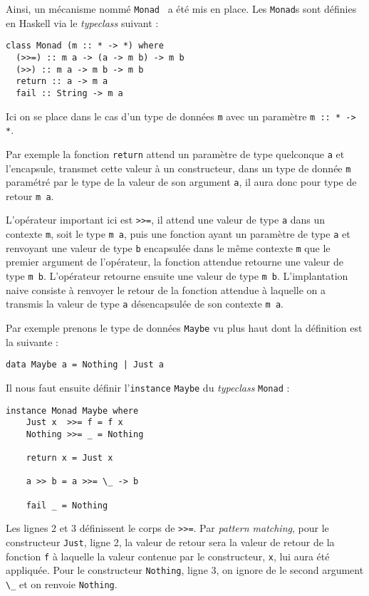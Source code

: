 \documentclass{llncs}
\begin{document}
Ainsi, un mécanisme nommé \lstinline{Monad}~\cite{Wadler90} a été mis en place.
Les \lstinline{Monad}s sont définies en Haskell via le \emph{typeclass} suivant :
\begin{lstlisting}
class Monad (m :: * -> *) where
  (>>=) :: m a -> (a -> m b) -> m b
  (>>) :: m a -> m b -> m b
  return :: a -> m a
  fail :: String -> m a
\end{lstlisting}

Ici on se place dans le cas d'un type de données \lstinline{m} avec un paramètre
\lstinline{m :: * -> *}.

Par exemple la fonction \lstinline{return} attend un paramètre de type quelconque
\lstinline{a} et l'encapsule, transmet cette valeur à un constructeur, dans
un type de donnée \lstinline{m} paramétré par le type de la valeur de son argument
\lstinline{a}, il aura donc pour type de retour \lstinline{m a}.

L'opérateur important ici est \lstinline{>>=}, il attend une valeur de type
\lstinline{a} dans un contexte \lstinline{m}, soit
le type \lstinline{m a}, puis une fonction ayant un paramètre de type \lstinline{a}
et renvoyant une valeur de type \lstinline{b} encapsulée dans le même contexte \lstinline{m}
que le premier argument de l'opérateur, la fonction attendue retourne
une valeur de type \lstinline{m b}. L'opérateur retourne ensuite une valeur de
type \lstinline{m b}.
L'implantation naive consiste à renvoyer le retour de la fonction attendue à
laquelle on a transmis la valeur de type \lstinline{a} désencapsulée de son contexte
\lstinline{m a}.

Par exemple prenons le type de données \lstinline{Maybe} vu plus haut dont la définition
est la suivante :
\begin{lstlisting}
data Maybe a = Nothing | Just a
\end{lstlisting}

Il nous faut ensuite définir l'\lstinline{instance} \lstinline{Maybe} du \emph{typeclass}
\lstinline{Monad} :
\begin{lstlisting}
instance Monad Maybe where
    Just x  >>= f = f x
    Nothing >>= _ = Nothing

    return x = Just x

    a >> b = a >>= \_ -> b

    fail _ = Nothing
\end{lstlisting}

Les lignes 2 et 3 définissent le corps de \lstinline{>>=}.
Par \emph{pattern matching}, pour le constructeur \lstinline{Just}, ligne 2,
la valeur de retour sera la valeur de retour de la fonction \lstinline{f} à
laquelle la valeur contenue par le constructeur, \lstinline{x}, lui aura été appliquée.
Pour le constructeur \lstinline{Nothing}, ligne 3, on ignore de le second argument
\lstinline{\_} et on renvoie \lstinline{Nothing}.
\end{document}
